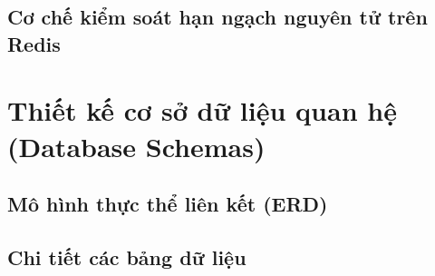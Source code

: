 \subsection{Cơ chế kiểm soát hạn ngạch nguyên tử trên Redis}

\section{Thiết kế cơ sở dữ liệu quan hệ (Database Schemas)}
\subsection{Mô hình thực thể liên kết (ERD)}

\subsection{Chi tiết các bảng dữ liệu}

